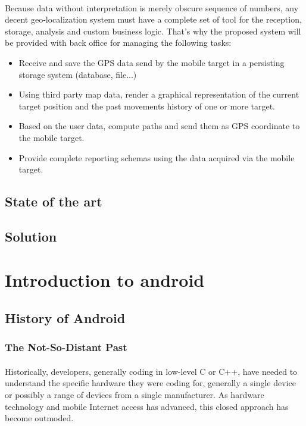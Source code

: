 \documentclass[12pt,a4paper]{report}
\begin{document}
\paragraph{}
Because data without interpretation is merely obscure sequence of numbers, any decent geo-localization system must have a complete set of tool for the reception, storage, analysis and custom business logic. That's why the proposed system will be provided with back office for managing the following tasks:
\begin{itemize}
\item Receive and save the GPS data send by the mobile target in a persisting storage system (database, file...)
\item Using third party map data, render a graphical representation of the current target position and the past movements history of one or more target.
\item Based on the user data, compute paths and send them as GPS coordinate to the mobile target.
\item Provide complete reporting schemas using the data acquired via the mobile target.
\end{itemize}

\subsection{State of the art}
\subsection{Solution}
\paragraph{}


\section{Introduction to android}
\subsection{History of Android}
\subsubsection{The Not-So-Distant Past}

\paragraph{}
Historically, developers, generally coding in low-level C or C++, have needed to understand the specific
hardware they were coding for, generally a single device or possibly a range of devices from a single
manufacturer. As hardware technology and mobile Internet access has advanced, this closed approach
has become outmoded.
\end{document}
